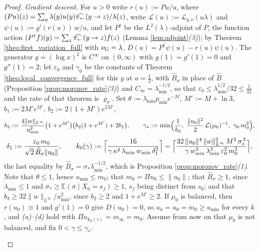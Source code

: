 \begin{proof}
\emph{Gradient descent.} For $u>0$ write $r(u):=Pu/u$, where $(Pu)(z)=\sum_y\lambda(y)u(y)\widehat{\pi_{\leftarrow}}(y\rightarrow z)/\lambda(z)$, write $\mathcal L(u):=\mathcal L_{g,\nu}(u\lambda)$ and $\psi(u):=g'(r(u))\,w/u$, and let $P^\dagger$ be the $L^2(\lambda)$-adjoint of $P$, the function action $(P^\dagger f)(y)=\sum_z\widehat{\pi_{\leftarrow}}(y\rightarrow z)f(z)$ (Lemma \ref{lem:adjoint}\emph{(3)}); by Theorem \ref{theo:first_variation_full} with $\nu_{\mathrm{G}}=\lambda$, $D(u)=P^\dagger\psi(u)-r(u)\psi(u)$. The generator $g=(\log x)^2$ is $C^\infty$ on $(0,\infty)$ with $g(1)=g'(1)=0$ and $g''(1)=2$; let $\varepsilon_0$ and $\gamma_0$ be the constants of Theorem \ref{theo:local_convergence_full} for this $g$ at $a=\frac12$, with $\widehat B_\sigma$ in place of $\widehat B$ (Proposition \ref{prop:morozov_rate}\emph{(3)}) and $C_\infty=\lambda_{\min}^{-1/2}$, so that $\varepsilon_0\leq\lambda_{\min}^{1/2}/32\leq\frac1{32}$ and the rate of that theorem is $\varrho_\sigma$. Set $\theta:=\lambda_{\min}p_{\min}e^{-M}$, $M':=M+\ln3$, $b_1:=2M'e^{M'}$, $b_2:=2(1+M')e^{2M'}$,
\begin{equation*}
    b_3:=\frac{4\|w\|_{L^\infty}}{u_{\min}^2}\bigl(1+e^{M'}\bigr)\bigl(b_2(1+e^{M'})+2b_1\bigr),\qquad
    \gamma_*:=\min\Bigl(\frac1{b_3},\ \frac{\|u_0\|^2}2\,\mathcal L(\mu_0)^{-1},\ \gamma_0\,m_0^2\Bigr),
\end{equation*}
\begin{equation*}
    \delta_1:=\frac{\varepsilon_0\,m_0}{\sqrt2\,\widehat B_\sigma\|u_0\|},\qquad
    k_0(\gamma):=\Bigl\lceil\frac{16}{\gamma\,\kappa^2\,\lambda_{\min}\,w_{\min}\,\delta_1^2}\Bigr\rceil
    =\Bigl\lceil\frac{32\,\|u_0\|^4\,\|w\|_{L^\infty}^2\,M^2\,\sigma_*^{\,2}}{\gamma\,w_{\min}^3\,\lambda_{\min}^3\,\varepsilon_0^2\,m_0^2}\Bigr\rceil,
\end{equation*}
the last equality by $\widehat B_\sigma=\sigma_*\lambda_{\min}^{-1/2}$, which is Proposition \ref{prop:morozov_rate}\emph{(1)}. Note that $\theta\leq1$, hence $u_{\min}\leq m_0$; that $m_0=\Pi u_0\leq\|u_0\|$; that $\widehat B_\sigma\geq1$, since $\lambda_{\min}\leq1$ and $\sigma_*\geq\mathbb E(\sigma\mid X_0=s_f)\geq1$, $s_f$ being distinct from $s_0$; and that $b_3\geq32\|w\|_{L^\infty}/u_{\min}^2$, since $b_2\geq2$ and $1+e^{M'}\geq2$. If $\mu_0$ is balanced, then $r(u_0)\equiv1$ and $g'(1)=0$ give $D(u_0)=0$, so $u_k=u_0=m_0\geq u_{\min}$ for every $k$, and \emph{(a)}--\emph{(d)} hold with $\Pi u_{k_0(\gamma)}=m_\infty=m_0$. Assume from now on that $\mu_0$ is not balanced, and fix $0<\gamma\leq\gamma_*$.
\begin{itemize}

\end{itemize}
\end{proof}
